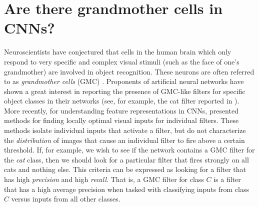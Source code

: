 \section{Are there grandmother cells in CNNs?}
\label{sec:grand-mother}
Neuroscientists have conjectured that cells in the human brain which only respond to very specific and complex visual stimuli (such as the face of one's grandmother) are involved in object recognition.
These neurons are often referred to as \emph{grandmother cells} (GMC) \cite{Barlow,Grandmother}. Proponents of artificial neural networks have shown a great interest in reporting the presence of GMC-like filters for specific object classes in their networks (see, for example, the cat filter reported in \cite{GoogleCat}). More recently, for understanding feature representations in CNNs, \cite{Simonyan,DeConv} presented methods for finding locally optimal visual inputs for individual filters.
These methods isolate individual inputs that activate a filter, but do not characterize the \emph{distribution} of images that cause an individual filter to fire above a certain threshold.
If, for example, we wish to see if the network contains a GMC filter for the \emph{cat} class, then we should look for a particular filter that fires strongly on all cats and nothing else.
This criteria can be expressed as looking for a filter that has high \emph{precision} and high \emph{recall}.
That is, a GMC filter for class $C$ is a filter that has a high average precision when tasked with classifying inputs from class $C$ versus inputs from all other classes.

 
